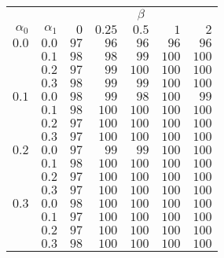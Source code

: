 \begin{tabular}{rr|rrrrr}
\hline\hline
 && \multicolumn{5}{c}{$\beta$}\\
 $\alpha_0$ & $\alpha_1$ & $0$ & $0.25$ & $0.5$ & $1$ & $2$ \\ 
 \hline
$0.0$ & $0.0$ & $97$ & $96$ & $96$ & $96$ & $96$\\ 
 & $0.1$ & $98$ & $98$ & $99$ & $100$ & $100$\\ 
 & $0.2$ & $97$ & $99$ & $100$ & $100$ & $100$\\ 
 & $0.3$ & $98$ & $99$ & $99$ & $100$ & $100$\\ 
\hline 
 $0.1$ & $0.0$ & $98$ & $99$ & $98$ & $100$ & $99$\\ 
 & $0.1$ & $98$ & $100$ & $100$ & $100$ & $100$\\ 
 & $0.2$ & $97$ & $100$ & $100$ & $100$ & $100$\\ 
 & $0.3$ & $97$ & $100$ & $100$ & $100$ & $100$\\ 
\hline 
 $0.2$ & $0.0$ & $97$ & $99$ & $99$ & $100$ & $100$\\ 
 & $0.1$ & $98$ & $100$ & $100$ & $100$ & $100$\\ 
 & $0.2$ & $97$ & $100$ & $100$ & $100$ & $100$\\ 
 & $0.3$ & $97$ & $100$ & $100$ & $100$ & $100$\\ 
\hline 
 $0.3$ & $0.0$ & $98$ & $100$ & $100$ & $100$ & $100$\\ 
 & $0.1$ & $97$ & $100$ & $100$ & $100$ & $100$\\ 
 & $0.2$ & $97$ & $100$ & $100$ & $100$ & $100$\\ 
 & $0.3$ & $98$ & $100$ & $100$ & $100$ & $100$\\ 
 \hline 
 \end{tabular}